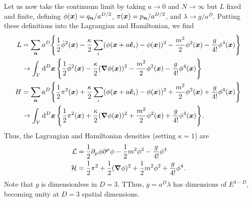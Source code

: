 {Let us now take the continuum limit by taking $a \rightarrow 0$ and $N \rightarrow \infty$ but $L$ fixed and finite, defining $\phi(\vb*{x}) = q_{\vb*{n}}/a^{D/2}$, $\pi(\vb*{x}) = p_{\vb*{n}} / a^{D/2}$, and $\lambda \rightarrow g/a^{D}$.
Putting these definitions into the Lagrangian and Hamiltonian, we find
\begin{align}
    L &= \sum_{\vb*{n}} a^{D} \Bigg\{ \frac{1}{2} \dot{\phi}^2(\vb*{x}) - \frac{\kappa}{2} \sum_{i} (\phi(\vb*{x} + a \vu*{e}_{i}) - \phi(\vb*{x}))^2 - \frac{m^2}{2} \phi^2(\vb*{x}) - \frac{g}{4!} \phi^{4}(\vb*{x}) \Bigg\} \nonumber \\
      &\rightarrow \int_{V} \dd[D]{\vb*{x}} \Bigg\{ \frac{1}{2} \dot{\phi}^2(\vb*{x}) - \frac{\kappa}{2} (\grad \phi(\vb*{x}))^2 - \frac{m^2}{2} \phi^2(\vb*{x}) - \frac{g}{4!} \phi^{4}(\vb*{x}) \Bigg\} \\
    H &= \sum_{\vb*{n}} a^{D} \Bigg\{ \frac{1}{2} \pi^2(\vb*{x}) + \frac{\kappa}{2} \sum_{i} (\phi(\vb*{x} + a \vu*{e}_{i}) - \phi(\vb*{x}))^2 + \frac{m^2}{2} \phi^2(\vb*{x}) + \frac{g}{4!} \phi^{4}(\vb*{x}) \Bigg\} \nonumber \\
      &\rightarrow \int_{V} \dd[D]{\vb*{x}} \Bigg\{ \frac{1}{2} \pi^2(\vb*{x}) + \frac{\kappa}{2} (\grad \phi(\vb*{x}))^2 + \frac{m^2}{2} \phi^2(\vb*{x}) + \frac{g}{4!} \phi^{4}(\vb*{x}) \Bigg\}
.\end{align}
Thus, the Lagrangian and Hamiltonian densities (setting $\kappa = 1$) are
\begin{align}
    \mathcal{L} &= \frac{1}{2} \partial_{\mu} \phi \partial^{\mu} \phi - \frac{1}{2} m^2 \phi^2 - \frac{g}{4!} \phi^{4} \\
    \mathcal{H} &= \frac{1}{2} \pi^2 + \frac{1}{2} (\grad \phi)^2 + \frac{1}{2} m^2 \phi^2 + \frac{g}{4!} \phi^{4}
.\end{align}
Note that $g$ is dimensionless in $D = 3$.
TThus, $g = a^{D} \lambda$ has dimensions of $E^{3-D}$, becoming unity at $D = 3$ spatial dimensions.

}
